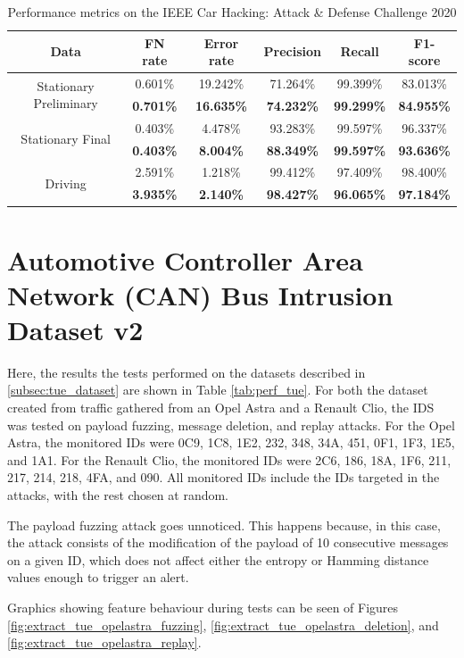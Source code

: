 \begin{table}
    \centering
    \begin{tabular}{*{6}{c}}
        \toprule
        \textbf{Data} & \textbf{FN rate} & \textbf{Error rate} & \textbf{Precision} & \textbf{Recall} & \textbf{F1-score}\\
        \midrule
        \multirow{2}{*}{Stationary Preliminary} & 0.601\% & 19.242\% & 71.264\% & 99.399\% & 83.013\%\\
        & \textbf{0.701\%} & \textbf{16.635\%} & \textbf{74.232\%} & \textbf{99.299\%} & \textbf{84.955\%}\\
        \multirow{2}{*}{Stationary Final} & 0.403\% & 4.478\% & 93.283\% & 99.597\% & 96.337\%\\
        & \textbf{0.403\%} & \textbf{8.004\%} & \textbf{88.349\%} & \textbf{99.597\%} & \textbf{93.636\%}\\
        \multirow{2}{*}{Driving} & 2.591\% & 1.218\% & 99.412\% & 97.409\% & 98.400\%\\
        & \textbf{3.935\%} & \textbf{2.140\%} & \textbf{98.427\%} & \textbf{96.065\%} & \textbf{97.184\%}\\
        \bottomrule
    \end{tabular}
    \caption{Performance metrics on the IEEE Car Hacking: Attack \& Defense Challenge 2020}
    \label{tab:perf_ieee_challenge}
\end{table}

\section{Automotive Controller Area Network (CAN) Bus Intrusion Dataset v2}

Here, the results the tests performed on the datasets described in \ref{subsec:tue_dataset} are shown in Table \ref{tab:perf_tue}. For both the dataset created from traffic gathered from an Opel Astra and a Renault Clio, the IDS was tested on payload fuzzing, message deletion, and replay attacks. For the Opel Astra, the monitored IDs were 0C9, 1C8, 1E2, 232, 348, 34A, 451, 0F1, 1F3, 1E5, and 1A1. For the Renault Clio, the monitored IDs were 2C6, 186, 18A, 1F6, 211, 217, 214, 218, 4FA, and 090. All monitored IDs include the IDs targeted in the attacks, with the rest chosen at random.\par
The payload fuzzing attack goes unnoticed. This happens because, in this case, the attack consists of the modification of the payload of 10 consecutive messages on a given ID, which does not affect either the entropy or Hamming distance values enough to trigger an alert.\par
Graphics showing feature behaviour during tests can be seen of Figures \ref{fig:extract_tue_opelastra_fuzzing}, \ref{fig:extract_tue_opelastra_deletion}, and \ref{fig:extract_tue_opelastra_replay}.

